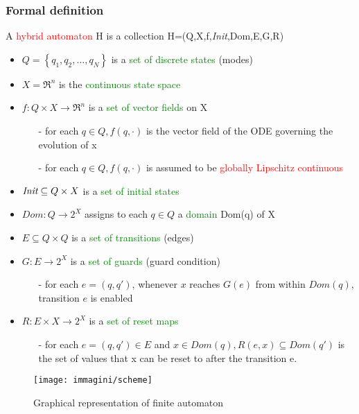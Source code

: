 \subsubsection{Formal definition}
A \textcolor{red}{hybrid automaton} H is a collection H=(Q,X,f,\textit{Init},Dom,E,G,R)
\begin{itemize}
	\item $Q = \left\{q_1,q_2, \dots,q_N\right\}$ is a \textcolor{green}{set of discrete states} (modes)
	\item $X=\Re^n$ is the \textcolor{green}{continuous state space}
	\item $f\colon Q\times X\to\Re^n$ is a \textcolor{green}{set of vector fields} on X
	\begin{itemize}
		\item[-] for each $q\in Q,f(q,\cdot)$ is the vector field of the ODE governing the evolution of x
		\item[-] for each $q\in Q,f(q,\cdot)$ is assumed to be \textcolor{red}{globally Lipschitz continuous}
	\end{itemize}
	\item $\emph{Init} \subseteq Q \times X$ is a \textcolor{green}{set of initial states}
	\item $Dom \colon Q \to 2^X$ assigns to each $q\in Q$ a \textcolor{green}{domain} Dom(q) of X
	\item $E \subseteq Q \times Q$ is a \textcolor{green}{set of transitions} (edges)
	\item $G\colon E\to 2^X$ is a \textcolor{green}{set of guards} (guard condition)
	\begin{itemize}
		\item[-] for each $e=(q,q')$, whenever $x$ reaches $G(e)$ from within $Dom(q)$, transition $e$ is enabled
	\end{itemize}
	\item $R\colon E\times X \to 2^X$ is a \textcolor{green}{set of reset maps}
	\begin{itemize}
		\item[-] for each $e=(q,q') \in E$ and $x \in Dom(q), R(e,x)\subseteq Dom(q')$ is the set of values that x can be reset to after the transition e.
	\end{itemize}
\end{itemize}
\begin{figure}[h]
	\centering
	\texttt{[image: immagini/scheme]}
	\caption{Graphical representation of finite automaton}
	\label{fig:scheme}
\end{figure}

